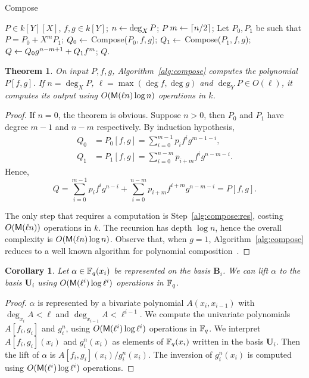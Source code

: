 \documentclass{sig-alternate}
\newtheorem{theorem}[definition]{Theorem}
\newtheorem{corollary}[definition]{Corollary}
\newcommand{\bb}{\mathbf{B}}
\newcommand{\uu}{\mathbf{U}}  %
\begin{document}
\begin{algorithm}[t]
  \caption{Compose}
  \label{alg:compose}
  \begin{algorithmic}[1]
    \REQUIRE $P\in k[Y][X]$, $f,g\in k[Y]$;
    \STATE $n \leftarrow \deg_X P$;
    \ENSURE $P$
    \ELSE
    \STATE $m \leftarrow \lceil n/2\rceil$;
    \STATE Let $P_0,P_1$ be such that $P = P_0 + X^mP_1$;
    \STATE $Q_0 \leftarrow$ Compose($P_0, f, g$);
    \STATE $Q_1 \leftarrow$ Compose($P_1, f, g$);
    \STATE \label{alg:compose:res}
    $Q \leftarrow Q_0g^{n-m+1} + Q_1f^m$;
    \ENSURE $Q$.
    \ENDIF
  \end{algorithmic}
\end{algorithm}

\begin{theorem}
  \label{th:compose}
  On input $P,f,g$, Algorithm~\ref{alg:compose} computes the
  polynomial $P[f,g]$. If $n=\deg_XP$, $\ell=\max(\deg f, \deg g)$ and
  $\deg_YP\in O(\ell)$, it computes its output using $O(\mathsf{M}(\ell
  n)\log n)$ operations in $k$.
\end{theorem}
\begin{proof}
  If $n=0$, the theorem is obvious. Suppose $n>0$, then $P_0$ and
  $P_1$ have degree $m-1$ and $n-m$ respectively. By induction
  hypothesis,
  \begin{equation}
    \begin{aligned}
      Q_0 &= P_0[f,g] = \sum_{i=0}^{m-1}p_if^ig^{m-1-i},\\
      Q_1 &= P_1[f,g] = \sum_{i=0}^{n-m}p_{i+m}f^ig^{n-m-i}.   
    \end{aligned}
  \end{equation}
  Hence,
  \begin{equation}
    Q = \sum_{i=0}^{m-1}p_if^ig^{n-i} +
    \sum_{i=0}^{n-m}p_{i+m}f^{i+m}g^{n-m-i} =
    P[f,g].
  \end{equation}

  The only step that requires a computation is
  Step~\ref{alg:compose:res}, costing $O(\mathsf{M}(\ell n))$ operations in
  $k$. The recursion has depth $\log n$, hence the overall complexity
  is $O(\mathsf{M}(\ell n)\log n)$.  Observe that, when $g=1$,
  Algorithm~\ref{alg:compose} reduces to a well known algorithm for
  polynomial composition~\cite[Ex.~9.20]{vzGG}.
\end{proof}

\begin{corollary}
  Let $\alpha\in\mathbb{F}_q(x_i)$ be represented on the basis $\bb_i$.
  We can \emph{lift} $\alpha$ to the basis $\uu_i$ using
  $O(\mathsf{M}(\ell^i)\log\ell^i)$ operations in $\mathbb{F}_q$.
\end{corollary}
\begin{proof}
  $\alpha$ is represented by a bivariate polynomial $A(x_i,x_{i-1})$ with
  $\deg_{x_i}A<\ell$ and $\deg_{x_{i-1}}A<\ell^{i-1}$.  We compute the univariate
  polynomials $A[f_i,g_i]$ and $g_i^n$, using $O(\mathsf{M}(\ell^i)\log\ell^i)$
  operations in $\mathbb{F}_q$. We interpret $A[f_i,g_i](x_i)$ and $g_i^n(x_i)$ as
  elements of $\mathbb{F}_q(x_i)$ written in the basis $\uu_i$. Then the
  lift of $\alpha$ is $A[f_i,g_i](x_i)/g_i^n(x_i)$. The inversion of $g_i^n(x_i)$
  is computed using $O(\mathsf{M}(\ell^i)\log\ell^i)$ operations.
\end{proof}
\end{document}
